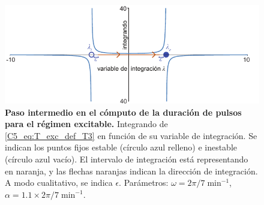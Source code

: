 \documentclass[./main.tex]{subfiles}
\begin{document}
 \begin{figure}
    \centering
    \includegraphics[width=1\columnwidth]{figures/chapter5/C5_T_exc_T3.pdf} 
    \caption{\textbf{Paso intermedio en el cómputo de la duración de pulsos para el régimen excitable.} Integrando de \ref{C5_eq:T_exc_def_T3} en función de su variable de integración. Se indican los puntos fijos estable \xxe (círculo azul relleno) e inestable \xxi (círculo azul vacío). El intervalo de integración está representando en naranja, y  las flechas naranjas indican la dirección de integración. A modo cualitativo, se indica $\epsilon$. Parámetros: $\omega=2\pi/7\;\text{min}^{-1}$, $\alpha = 1.1 \times 2\pi/7\;\text{min}^{-1}$.}
    \label{C5_fig:T_exc_T3}
\end{figure}
\end{document}
